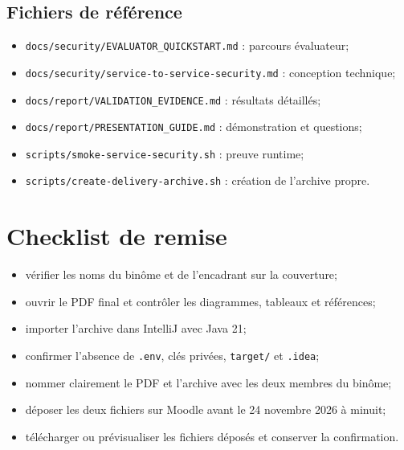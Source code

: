\documentclass[12pt,a4paper,oneside]{report}
\newcommand{\code}[1]{\texttt{#1}}
\begin{document}
\section{Fichiers de référence}
\begin{itemize}
  \item \code{docs/security/EVALUATOR\_QUICKSTART.md} : parcours évaluateur;
  \item \code{docs/security/service-to-service-security.md} : conception technique;
  \item \code{docs/report/VALIDATION\_EVIDENCE.md} : résultats détaillés;
  \item \code{docs/report/PRESENTATION\_GUIDE.md} : démonstration et questions;
  \item \code{scripts/smoke-service-security.sh} : preuve runtime;
  \item \code{scripts/create-delivery-archive.sh} : création de l'archive propre.
\end{itemize}

\chapter{Checklist de remise}
\begin{itemize}[label=$\square$]
  \item vérifier les noms du binôme et de l'encadrant sur la couverture;
  \item ouvrir le PDF final et contrôler les diagrammes, tableaux et références;
  \item importer l'archive dans IntelliJ avec Java 21;
  \item confirmer l'absence de \code{.env}, clés privées, \code{target/} et \code{.idea};
  \item nommer clairement le PDF et l'archive avec les deux membres du binôme;
  \item déposer les deux fichiers sur Moodle avant le 24 novembre 2026 à minuit;
  \item télécharger ou prévisualiser les fichiers déposés et conserver la confirmation.
\end{itemize}
\end{document}
